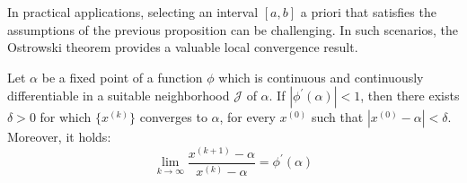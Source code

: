 \documentclass[12pt, a4paper]{report}
\begin{document}
    In practical applications, selecting an interval $[a,b]$ a priori that satisfies the assumptions of the previous proposition can be challenging.
    In such scenarios, the Ostrowski theorem provides a valuable local convergence result.
    \begin{theorem}
        Let $\alpha$ be a fixed point of a function $\phi$ which is continuous and continuously differentiable in a suitable neighborhood $\mathcal{J}$ of $\alpha$. 
        If $\left\lvert \phi^{'}(\alpha) \right\rvert < 1$, then there exists $\delta > 0$ for which $\{x^{(k)}\}$ converges to $\alpha$, for every $x^{(0)}$ such that $\left\lvert x^{(0)}-\alpha \right\rvert < \delta$. 
        Moreover, it holds: 
        \[\lim_{k \rightarrow \infty}\dfrac{x^{(k+1)}-\alpha}{x^{(k)}-\alpha}=\phi^{'}(\alpha)\]
    \end{theorem}
\end{document}
